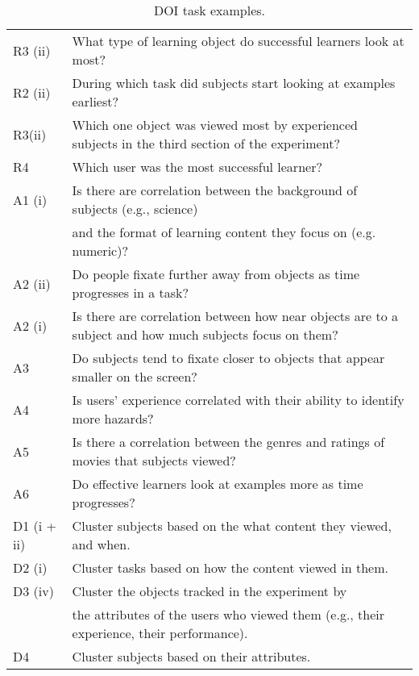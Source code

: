 \begin{sidewaystable}
\begin{tabular}{|l|l|}
R3 (ii) &What type of learning object do successful learners look at most?\\
R2 (ii)&  During which task did subjects start looking at examples earliest?\\
R3(ii) &Which one object was viewed most by experienced subjects in the third section of the experiment?\\
R4 & Which user was the most successful learner?\\
    \hline
    A1 (i)& Is there are correlation between the background of subjects (e.g., science) \\&and the format of learning content they focus on (e.g. numeric)?\\
A2 (ii)& Do people fixate further away from objects as time progresses in a task?\\
A2 (i) & Is there are correlation between how near objects are to a subject and how much subjects focus on them?\\
A3 &  Do subjects tend to fixate closer to objects that appear smaller on the screen?\\
A4& Is users’ experience correlated with their ability to identify more hazards? \\
A5& Is there a correlation between the genres and ratings of movies that subjects viewed? \\
A6& Do effective learners look at examples more as time progresses?\\
\hline
D1 (i + ii) & Cluster subjects based on the what content they viewed, and when.\\
D2 (i) & Cluster tasks based on how the content viewed in them. \\
D3 (iv) &Cluster the objects tracked in the experiment by \\&the attributes of the users who viewed them (e.g., their experience, their performance).
\\
D4 & Cluster subjects based on their attributes. \\
\hline
    \end{tabular} 
    \caption{DOI task examples.}
    \label{tab:Tasks}
\end{sidewaystable}


